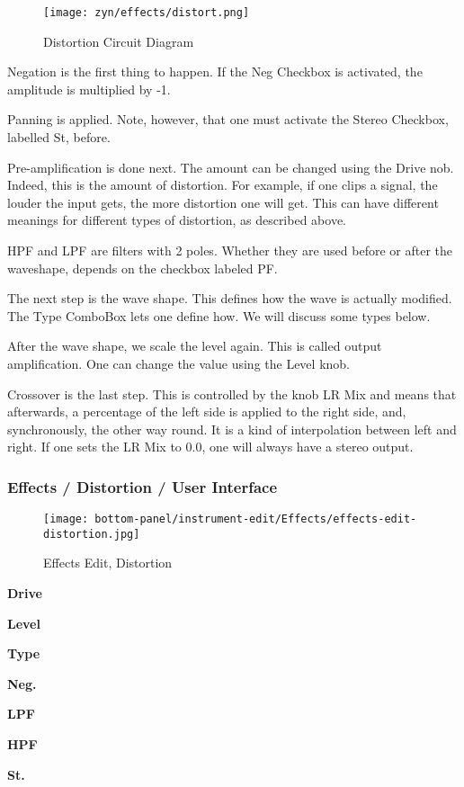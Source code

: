 \begin{figure}[H]
   \centering 
   \texttt{[image: zyn/effects/distort.png]}
   \caption{Distortion Circuit Diagram}
   \label{fig:distortion_circuit_diagram}
\end{figure}

   Negation is the first thing to happen. If the Neg Checkbox is activated,
   the amplitude is multiplied by -1.

   Panning is applied. Note, however, that one must activate the Stereo
   Checkbox, labelled St, before.

   Pre-amplification is done next. The amount can be changed using the Drive
   nob. Indeed, this is the amount of distortion. For example, if one clips a
   signal, the louder the input gets, the more distortion one will get. This
   can have different meanings for different types of distortion, as
   described above.

   HPF and LPF are filters with 2 poles. Whether they are used before or
   after the waveshape, depends on the checkbox labeled PF.

   The next step is the wave shape. This defines how the wave is actually
   modified. The Type ComboBox lets one define how. We will discuss some
   types below.

   After the wave shape, we scale the level again. This is called output
   amplification. One can change the value using the Level knob.

   Crossover is the last step. This is controlled by the knob LR Mix and
   means that afterwards, a percentage of the left side is applied to the
   right side, and, synchronously, the other way round. It is a kind of
   interpolation between left and right. If one sets the LR Mix to 0.0, one
   will always have a stereo output.

\subsubsection{Effects / Distortion / User Interface}
\label{subsubsec:effects_edit_distortion_ui}

\begin{figure}[H]
   \centering 
   \texttt{[image: bottom-panel/instrument-edit/Effects/effects-edit-distortion.jpg]}
   \caption{Effects Edit, Distortion}
   \label{fig:effects_edit_distortion}
\end{figure}

   \begin{enumber}
      \item \textbf{Drive}
      \item \textbf{Level}
      \item \textbf{Type}
      \item \textbf{Neg.}
      \item \textbf{LPF}
      \item \textbf{HPF}
      \item \textbf{St.}
   \end{enumber}

